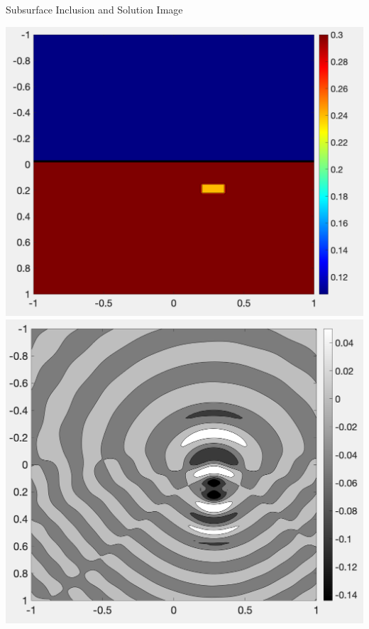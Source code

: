 \documentclass[handout]{beamer}
\begin{document}
\begin{frame}{Subsurface Inclusion and Solution Image}
\begin{center}
\includegraphics[scale=.2252]{images/bg}\includegraphics[scale=.23]{images/sol}
\end{center}
\end{frame}







\end{document}

